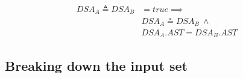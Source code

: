\begin{itemize}
\begin{equation}
\begin{split}
  DSA_{A} \triangleq DSA_{B} & = true \implies \\
   & DSA_{A} \circeq DSA_{B} ~ \wedge \\
   & DSA_{A}.AST = DSA_{B}.AST
 \end{split}
\end{equation}
\end{itemize}




\subsection{Breaking down the input set}

